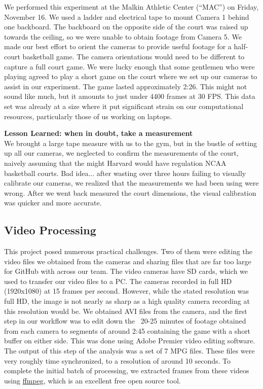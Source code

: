 \documentclass{article}
\begin{document}
We performed this experiment at the Malkin Athletic Center (``MAC'') on Friday, November 16.  
We used a ladder and electrical tape to mount Camera 1 behind one backboard.
The backboard on the opposite side of the court was raised up towards the ceiling,
so we were unable to obtain footage from Camera 5.
We made our best effort to orient the cameras to provide useful footage for a half-court basketball game.  
The camera orientations would need to be different to capture a full court game.
We were lucky enough that some gentlemen who were playing agreed to play
a short game on the court where we set up our cameras to assist in our experiment.
The game lasted approximately 2:26.  This might not sound like much, but it amounts to just under 4400 frames at 30 FPS.
This data set was already at a size where it put significant strain on our computational resources,
particularly those of us working on laptops.

\textbf{Lesson Learned: when in doubt, take a measurement}\\
We brought a large tape measure with us to the gym, but in the bustle of setting up 
all our cameras, we neglected to confirm the measurements of the court,
naively assuming that the might Harvard would have regulation NCAA basketball courts.
Bad idea... after wasting over three hours failing to visually calibrate our cameras,
we realized that the measurements we had been using were wrong.
After we went back measured the court dimensions, the visual calibration
was quicker and more accurate.

\subsection{Video Processing}
This project posed numerous practical challenges.  
Two of them were editing the video files we obtained from the cameras 
and sharing files that are far too large for GitHub with across our team.
The video cameras have SD cards, which we used to transfer our video files to a PC.
The cameras recorded in full HD (1920x1080) at 15 frames per second.
However, while the stated resolution was full HD, the image is not nearly as sharp
as a high quality camera recording at this resolution would be.
We obtained AVI files from the camera, and the first step in our workflow was to 
edit down the ~20-25 minutes of footage obtained from each camera to segments
of around 2:45 containing the game with a short buffer on either side. 
This was done using Adobe Premier video editing software.
The output of this step of the analysis was a set of 7 MPG files.
These files were very roughly time synchronized, to a resolution of around 10 seconds.
To complete the initial batch of processing, we extracted frames from these videos
using \href{https://www.ffmpeg.org/}{ffmpeg}, which is an excellent free open source tool.
\end{document}
